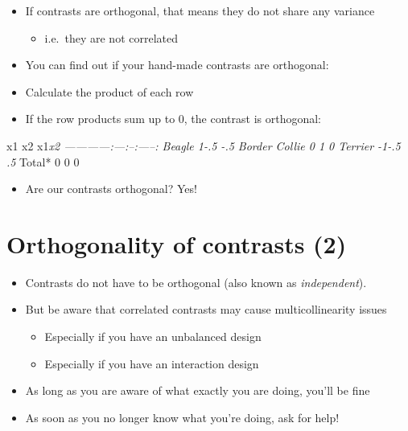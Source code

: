 \documentclass[]{article}
\begin{document}
\begin{itemize}
\itemsep1pt\parskip0pt
\item
  If contrasts are orthogonal, that means they do not share any variance

  \begin{itemize}
  \itemsep1pt\parskip0pt
  \item
    i.e.~they are not correlated
  \end{itemize}
\item
  You can find out if your hand-made contrasts are orthogonal:
\item
  Calculate the product of each row
\item
  If the row products sum up to 0, the contrast is orthogonal:
\end{itemize}

\textbar{} \textbar{} x1 \textbar{} x2\textbar{} x1\emph{x2\textbar{}
\textbar{}------------:\textbar{}---:\textbar{}--:\textbar{}-----:\textbar{}
\textbar{}Beagle \textbar{} 1\textbar{}-.5\textbar{} -.5\textbar{}
\textbar{}Border Collie\textbar{} 0\textbar{} 1\textbar{} 0\textbar{}
\textbar{}Terrier \textbar{} -1\textbar{}-.5\textbar{} .5\textbar{}
\textbar{}}Total* \textbar{} 0\textbar{} 0\textbar{} 0\textbar{}

\begin{itemize}
\itemsep1pt\parskip0pt
\item
  Are our contrasts orthogonal? Yes!
\end{itemize}

\section{Orthogonality of contrasts
(2)}\label{orthogonality-of-contrasts-2}

\begin{itemize}
\itemsep1pt\parskip0pt
\item
  Contrasts do not have to be orthogonal (also known as
  \emph{independent}).
\item
  But be aware that correlated contrasts may cause multicollinearity
  issues

  \begin{itemize}
  \itemsep1pt\parskip0pt
  \item
    Especially if you have an unbalanced design
  \item
    Especially if you have an interaction design
  \end{itemize}
\item
  As long as you are aware of what exactly you are doing, you'll be fine
\item
  As soon as you no longer know what you're doing, ask for help!
\end{itemize}
\end{document}
